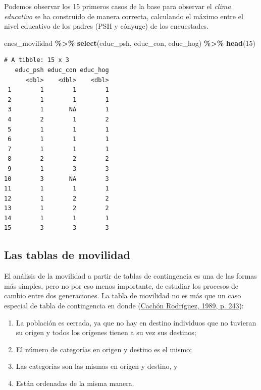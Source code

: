 \documentclass[
]{article}
\newenvironment{Shaded}{\begin{snugshade}}{\end{snugshade}}
\newcommand{\DecValTok}[1]{\textcolor[rgb]{0.00,0.00,0.81}{#1}}
\newcommand{\FunctionTok}[1]{\textcolor[rgb]{0.13,0.29,0.53}{\textbf{#1}}}
\newcommand{\NormalTok}[1]{#1}
\newcommand{\SpecialCharTok}[1]{\textcolor[rgb]{0.81,0.36,0.00}{\textbf{#1}}}
\providecommand{\tightlist}{%
  \setlength{\itemsep}{0pt}\setlength{\parskip}{0pt}}
\begin{document}
Podemos observar los 15 primeros casos de la base para observar el \emph{clima educativo} se ha construido de manera correcta, calculando el máximo entre el nivel educativo de los padres (PSH y cónyuge) de los encuestades.

\begin{Shaded}
\begin{Highlighting}[]
\NormalTok{enes\_movilidad }\SpecialCharTok{\%\textgreater{}\%}
    \FunctionTok{select}\NormalTok{(educ\_psh, educ\_con, educ\_hog) }\SpecialCharTok{\%\textgreater{}\%}
    \FunctionTok{head}\NormalTok{(}\DecValTok{15}\NormalTok{)}
\end{Highlighting}
\end{Shaded}

\begin{verbatim}
# A tibble: 15 x 3
   educ_psh educ_con educ_hog
      <dbl>    <dbl>    <dbl>
 1        1        1        1
 2        1        1        1
 3        1       NA        1
 4        2        1        2
 5        1        1        1
 6        1        1        1
 7        1        1        1
 8        2        2        2
 9        1        3        3
10        3       NA        3
11        1        1        1
12        1        2        2
13        1        2        2
14        1        1        1
15        3        3        3
\end{verbatim}

\hypertarget{movilidad2}{%
\subsection{Las tablas de movilidad}\label{movilidad2}}

El análisis de la movilidad a partir de tablas de contingencia es una de las formas más simples, pero no por eso menos importante, de estudiar los procesos de cambio entre dos generaciones. La tabla de movilidad no es más que un caso especial de tabla de contingencia en donde (\protect\hyperlink{ref-CachonRodriguez1989}{Cachón Rodríguez, 1989, p. 243}):

\begin{enumerate}
\def\labelenumi{\arabic{enumi}.}
\tightlist
\item
  La población es cerrada, ya que no hay en destino individuos que no tuvieran su origen y todos los orígenes tienen a su vez sus destinos;\\
\item
  El número de categorías en origen y destino es el mismo;\\
\item
  Las categorías son las mismas en origen y destino, y\\
\item
  Están ordenadas de la misma manera.
\end{enumerate}
\end{document}
